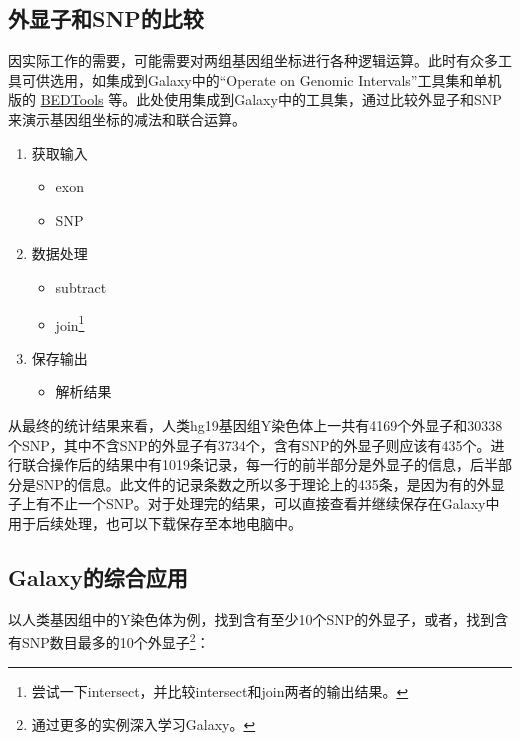\documentclass[11pt,a4paper,twoside]{book}
\begin{document}
\subsection{外显子和SNP的比较}
因实际工作的需要，可能需要对两组基因组坐标进行各种逻辑运算。此时有众多工具可供选用，如集成到Galaxy中的“Operate on Genomic Intervals”工具集和单机版的 \href{http://bedtools.readthedocs.org/en/latest}{BEDTools} 等。此处使用集成到Galaxy中的工具集，通过比较外显子和SNP来演示基因组坐标的减法和联合运算。
\begin{enumerate}
    \item 获取输入
      \begin{itemize}
        \item exon
        \item SNP
      \end{itemize}
    \item 数据处理
      \begin{itemize}
        \item subtract
	\item join\footnote{尝试一下intersect，并比较intersect和join两者的输出结果。}
      \end{itemize}
    \item 保存输出
      \begin{itemize}
        \item 解析结果
      \end{itemize}
\end{enumerate}

从最终的统计结果来看，人类hg19基因组Y染色体上一共有4169个外显子和30338个SNP，其中不含SNP的外显子有3734个，含有SNP的外显子则应该有435个。进行联合操作后的结果中有1019条记录，每一行的前半部分是外显子的信息，后半部分是SNP的信息。此文件的记录条数之所以多于理论上的435条，是因为有的外显子上有不止一个SNP。对于处理完的结果，可以直接查看并继续保存在Galaxy中用于后续处理，也可以下载保存至本地电脑中。

\subsection{Galaxy的综合应用}
以人类基因组中的Y染色体为例，找到含有至少10个SNP的外显子，或者，找到含有SNP数目最多的10个外显子\footnote{通过更多的实例深入学习Galaxy。}：
\end{document}
